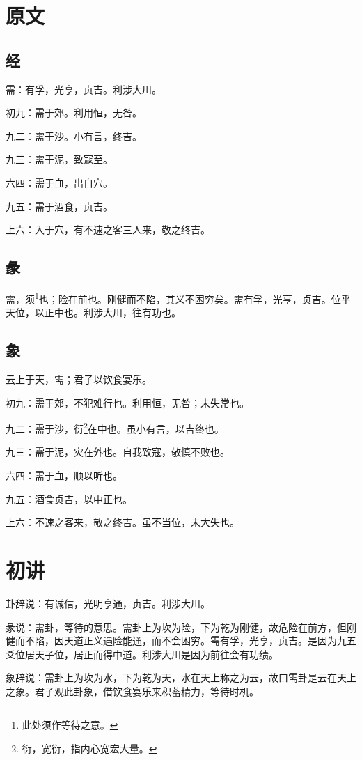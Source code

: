 \documentclass[12pt,oneside]{book}
\begin{document}
\section{原文}

\subsection{经}
需：有孚，光亨，贞吉。利涉大川。

初九：需于郊。利用恒，无咎。

九二：需于沙。小有言，终吉。

九三：需于泥，致寇至。

六四：需于血，出自穴。

九五：需于酒食，贞吉。

上六：入于穴，有不速之客三人来，敬之终吉。

\subsection{彖}
需，须\footnote{此处须作等待之意。}也；险在前也。刚健而不陷，其义不困穷矣。需有孚，光亨，贞吉。位乎天位，以正中也。利涉大川，往有功也。

\subsection{象}
云上于天，需；君子以饮食宴乐。

初九：需于郊，不犯难行也。利用恒，无咎；未失常也。

九二：需于沙，衍\footnote{衍，宽衍，指内心宽宏大量。}在中也。虽小有言，以吉终也。

九三：需于泥，灾在外也。自我致寇，敬慎不败也。

六四：需于血，顺以听也。

九五：酒食贞吉，以中正也。

上六：不速之客来，敬之终吉。虽不当位，未大失也。

\section{初讲}
卦辞说：有诚信，光明亨通，贞吉。利涉大川。

彖说：需卦，等待的意思。需卦上为坎为险，下为乾为刚健，故危险在前方，但刚健而不陷，因天道正义遇险能通，而不会困穷。需有孚，光亨，贞吉。是因为九五爻位居天子位，居正而得中道。利涉大川是因为前往会有功绩。

象辞说：需卦上为坎为水，下为乾为天，水在天上称之为云，故曰需卦是云在天上之象。君子观此卦象，借饮食宴乐来积蓄精力，等待时机。
\end{document}
